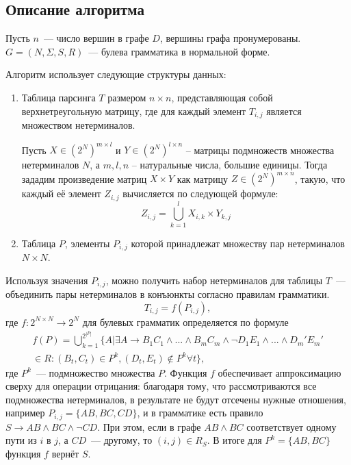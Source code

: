 \subsection {Описание алгоритма}
Пусть $n$~--- число вершин в графе $D$, вершины графа пронумерованы. $G = (N, \Sigma, S, R)$~--- булева грамматика в нормальной форме.

Алгоритм использует следующие структуры данных:
\begin{enumerate}
\item Таблица парсинга $T$ размером $n \times n$, представляющая собой верхнетреугольную матрицу, где для каждый элемент $T_{i, j}$ является множеством нетерминалов.

Пусть $X \in {(2^N)}^{m \times l}$ и $Y \in {(2^N)}^{l \times n}$ – матрицы подмножеств множества нетерминалов $N$, а $m, l, n$ – натуральные числа, большие единицы. Тогда зададим произведение матриц $X \times Y$ как матрицу $Z \in {(2^N)}^{m \times n}$, такую, что каждый её элемент $Z_{i, j}$ вычисляется по следующей формуле:
\begin{equation}\label{eq:mult}
Z_{i,j} = \bigcup_{k=1}^{l}X_{i,k} \times Y_{k, j}
\end{equation}
\item Таблица $P$, элементы $P_{i,j}$ которой принадлежат множеству пар нетерминалов $N \times N$.
\end{enumerate}

Используя значения $P_{i,j}$, можно получить набор нетерминалов для таблицы $T$~--- объединить пары нетерминалов в конъюнкты согласно правилам грамматики.
\begin{equation}
T_{i,j} = f(P_{i,j}),
\end{equation}
где $f: 2^{N \times N} \to 2^N$ для булевых грамматик определяется по формуле
\begin{equation*}
\begin{aligned}
f(P) = \bigcup_{k=1}^{2^{|P|}} \{A| \exists A \to B_1C_1 \wedge ... \wedge B_mC_m \wedge \neg D_1E_1 \wedge ... \wedge D_m'E_m' \\
\in R: (B_t, C_t) \in P^k, (D_t, E_t) \not\in P^k \forall t\},
\end{aligned}
\end{equation*}
где $P^k$~--- подмножество множества $P$. Функция $f$ обеспечивает аппроксимацию сверху для операции отрицания: благодаря тому, что рассмотриваются все подмножества нетерминалов, в результате не будут отсечены нужные отношения, например $P_{i,j} = \{AB, BC, CD\}$, и в грамматике есть правило $S \to AB \wedge BC \wedge \neg CD$. При этом, если в графе $AB \wedge BC$ соответствует одному пути из $i$ в $j$, а $CD$~--- другому, то $(i,j) \in R_S$. В итоге для $P^k = \{AB, BC\}$ функция $f$ вернёт $S$.

